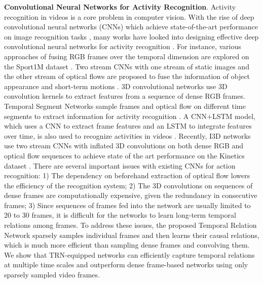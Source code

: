 \documentclass[runningheads]{llncs}
\begin{document}
\textbf{Convolutional Neural Networks for Activity Recognition}. Activity recognition in videos is a core problem in computer vision. With the rise of deep convolutional neural networks (CNNs) which achieve state-of-the-art performance on image recognition tasks \cite{krizhevsky2012imagenet,zhou2014learning}, many works have looked into designing effective deep convolutional neural networks for activity recognition \cite{karpathy2014large,simonyan2014two,donahue2015long,tran2015learning,wang2016temporal,carreira2017quo}. For instance, various approaches of fusing RGB frames over the temporal dimension are explored on the Sport1M dataset \cite{karpathy2014large}. Two stream CNNs with one stream of static images and the other stream of optical flows are proposed to fuse the information of object appearance and short-term motions \cite{simonyan2014two}. 3D convolutional networks \cite{tran2015learning} use 3D convolution kernels to extract features from a sequence of dense RGB frames. Temporal Segment Networks sample frames and optical flow on different time segments to extract information for activity recognition \cite{wang2016temporal}. A CNN+LSTM model, which uses a CNN to extract frame features and an LSTM to integrate features over time, is also used to recognize activities in videos \cite{donahue2015long}. Recently, I3D networks \cite{carreira2017quo} use two stream CNNs with inflated 3D convolutions on both dense RGB and optical flow sequences to achieve state of the art performance on the Kinetics dataset \cite{kay2017kinetics}. There are several important issues with existing CNNs for action recognition: 1) The dependency on beforehand extraction of optical flow lowers the efficiency of the recognition system; 2) The 3D convolutions on sequences of dense frames are computationally expensive, given the redundancy in consecutive frames; 3) Since sequences of frames fed into the network are usually limited to 20 to 30 frames, it is difficult for the networks to learn long-term temporal relations among frames. To address these issues, the proposed Temporal Relation Network sparsely samples individual frames and then learns their causal relations, which is much more efficient than sampling dense frames and convolving them. We show that TRN-equipped networks can efficiently capture temporal relations at multiple time scales and outperform dense frame-based networks using only sparsely sampled video frames.
\end{document}

